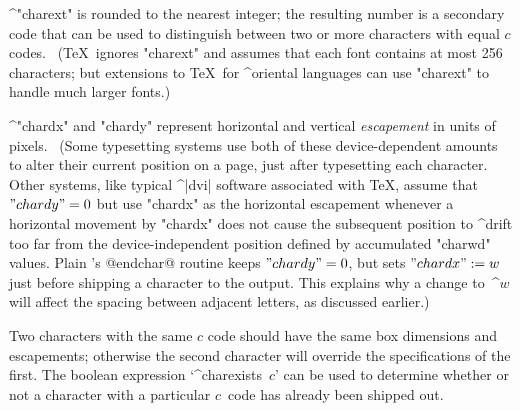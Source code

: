 {{{{\smallskip\textindent\bull^"charext" is rounded to the nearest integer;
the resulting number is a secondary code that can be used to distinguish
between two or more characters with equal $c$ codes. \ (\TeX\ ignores
"charext" and assumes that each font contains at most 256 characters; but
extensions to \TeX\ for ^{oriental} languages can use "charext" to handle
much larger fonts.)

\smallskip\textindent\bull^"chardx" and "chardy" represent horizontal and
vertical {\sl escapement\/} in units of pixels. \ (Some typesetting
systems use both of these device-dependent amounts to alter their current
position on a page, just after typesetting each character. Other systems,
like typical ^|dvi| software associated with \TeX, assume that $"chardy"=0$
but use "chardx" as the horizontal escapement whenever a horizontal
movement by "chardx" does not cause the subsequent position to ^{drift}
too far from the device-independent position defined by accumulated
"charwd" values. Plain \MF's @endchar@ routine keeps $"chardy"=0$, but
sets $"chardx":=w$ just before shipping a character to the output.  This
explains why a change to~^{$w$} will affect the spacing between adjacent
letters, as discussed earlier.) 

\ddanger Two characters with the same $c$ code
should have the same box dimensions and escapements; otherwise
the second character will override the specifications of the first. The boolean
expression `^{charexists}~$c$' can be used to determine whether or not
a character with a particular $c$~code has already been shipped out.

}}}}
